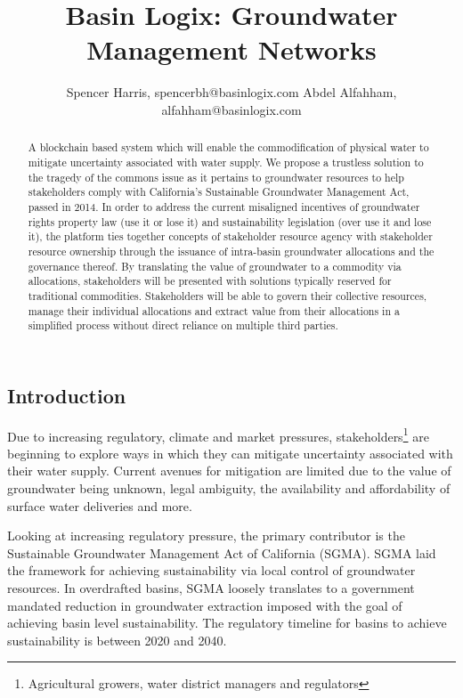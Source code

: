 \documentclass{tufte-handout}
\title{{\large Basin Logix: Groundwater Management Networks
}}
\author[Spencer Harris, spencerbh@basinlogix.com]{{\scriptsize Spencer Harris, spencerbh@basinlogix.com \break Abdel Alfahham, alfahham@basinlogix.com}}
\begin{document}
\maketitle%
\begin{fullwidth}
\begin{abstract}
\noindent A blockchain based system which will enable the commodification of physical water to mitigate uncertainty associated with water supply. We propose a trustless solution to the tragedy of the commons issue as it pertains to groundwater resources to help stakeholders comply with California's Sustainable Groundwater Management Act, passed in 2014. In order to address the current misaligned incentives of groundwater rights property law (use it or lose it) and sustainability legislation (over use it and lose it), the platform ties together concepts of stakeholder resource agency with stakeholder resource ownership through the issuance of intra-basin groundwater allocations and the governance thereof. By translating the value of groundwater to a commodity via allocations, stakeholders will be presented with solutions typically reserved for traditional commodities. Stakeholders will be able to govern their collective resources, manage their individual allocations and extract value from their allocations in a simplified process without direct reliance on multiple third parties. 
\end{abstract}
\end{fullwidth}

\subsection{Introduction}\label{sec:headings}

Due to increasing regulatory, climate and market pressures, stakeholders\footnote{Agricultural growers, water district managers and regulators} are beginning to explore ways in which they can mitigate uncertainty associated with their water supply. Current avenues for mitigation are limited due to the value of groundwater being unknown, legal ambiguity, the availability and affordability of surface water deliveries and more. 

Looking at increasing regulatory pressure, the primary contributor is the Sustainable Groundwater Management Act of California (SGMA)\cite{SGMA}. SGMA laid the framework for achieving sustainability via local control of groundwater resources. In overdrafted basins, SGMA loosely translates to a government mandated reduction in groundwater extraction imposed with the goal of achieving basin level sustainability. The regulatory timeline for basins to achieve sustainability is between 2020 and 2040. 
\end{document}
